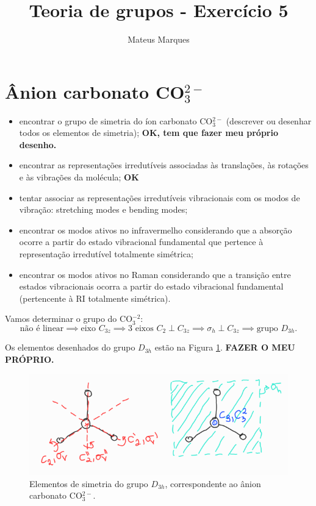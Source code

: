 \documentclass[a4paper,10pt]{article}
\title{\Huge{\textbf{Teoria de grupos - Exercício 5}}}
\author{Mateus Marques}
\begin{document}
\maketitle

\section*{Ânion carbonato CO$_3^{2-}$}
\begin{itemize}
\item encontrar o grupo de simetria do íon carbonato CO$_3^{2-}$ (descrever ou desenhar todos os elementos de simetria); \textbf{OK, tem que fazer meu próprio desenho.}
\item encontrar as representações irredutíveis associadas às translações, às rotações e às vibrações da molécula; \textbf{OK}
\item tentar associar as representações irredutíveis vibracionais com os modos de vibração: stretching modes e bending modes;
\item encontrar os modos ativos no infravermelho considerando que a absorção ocorre a partir do estado vibracional fundamental que pertence à representação irredutível totalmente simétrica;
\item encontrar os modos ativos no Raman considerando que a transição entre estados vibracionais ocorra a partir do estado vibracional fundamental (pertencente à RI totalmente simétrica).
\end{itemize}

\n\n

Vamos determinar o grupo do CO$_3^{-2}$:
$$
\text{não é linear} \implies \text{eixo }C_{3z} \implies
\text{3 eixos }C_2 \perp C_{3z} \implies
\sigma_h \perp C_{3z} \implies \boxed{ \text{grupo }D_{3h}. }
$$

Os elementos desenhados do grupo $D_{3h}$ estão na Figura \ref{fig:D3h}. \textbf{FAZER O MEU PRÓPRIO.}
\begin{figure}[H]
\centering
\includegraphics[width=0.6\linewidth]{fig/D3h.png}
\caption{Elementos de simetria do grupo $D_{3h}$, correspondente ao ânion carbonato CO$_3^{2-}$.}
\label{fig:D3h}
\end{figure}
\end{document}
